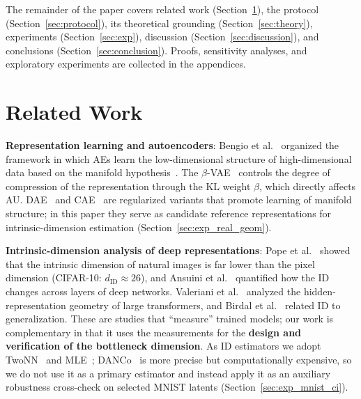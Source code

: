 \documentclass[make,article,submit,pdftex,moreauthors]{Definitions/mdpi}
\newcommand{\dID}{d_{\mathrm{ID}}}
\begin{document}
The remainder of the paper covers related work (Section~\ref{sec:related}),
the protocol (Section~\ref{sec:protocol}), its theoretical grounding
(Section~\ref{sec:theory}), experiments (Section~\ref{sec:exp}), discussion
(Section~\ref{sec:discussion}), and conclusions
(Section~\ref{sec:conclusion}).
Proofs, sensitivity analyses, and exploratory experiments are collected in
the appendices.

\section{Related Work}\label{sec:related}

\textbf{Representation learning and autoencoders}:
Bengio et al.~\cite{bengio2013representation} organized the framework in
which AEs learn the low-dimensional structure of high-dimensional data based
on the manifold hypothesis~\cite{fefferman2016manifold}.
The $\beta$-VAE~\cite{higgins2017betavae} controls the degree of compression
of the representation through the KL weight $\beta$, which directly affects
AU.
DAE~\cite{alain2014dae} and CAE~\cite{rifai2011cae} are regularized variants
that promote learning of manifold structure; in this paper they serve as
candidate reference representations for intrinsic-dimension estimation
(Section~\ref{sec:exp_real_geom}).

\textbf{Intrinsic-dimension analysis of deep representations}:
Pope et al.~\cite{pope2021intrinsic} showed that the intrinsic dimension of
natural images is far lower than the pixel dimension (CIFAR-10:
$\dID \approx 26$), and Ansuini et al.~\cite{ansuini2019intrinsic}
quantified how the ID changes across layers of deep networks.
Valeriani et al.~\cite{valeriani2023geometry} analyzed the hidden-representation
geometry of large transformers, and Birdal et
al.~\cite{birdal2021intrinsic} related ID to generalization.
These are studies that ``measure'' trained models; our work is complementary
in that it uses the measurements for the \textbf{design and verification of
the bottleneck dimension}.
As ID estimators we adopt TwoNN~\cite{facco2017twonn} and
MLE~\cite{levina2005mle}; DANCo~\cite{ceruti2014danco} is more precise but
computationally expensive, so we do not use it as a primary estimator and
instead apply it as an auxiliary robustness cross-check on selected MNIST
latents (Section~\ref{sec:exp_mnist_ci}).
\end{document}
